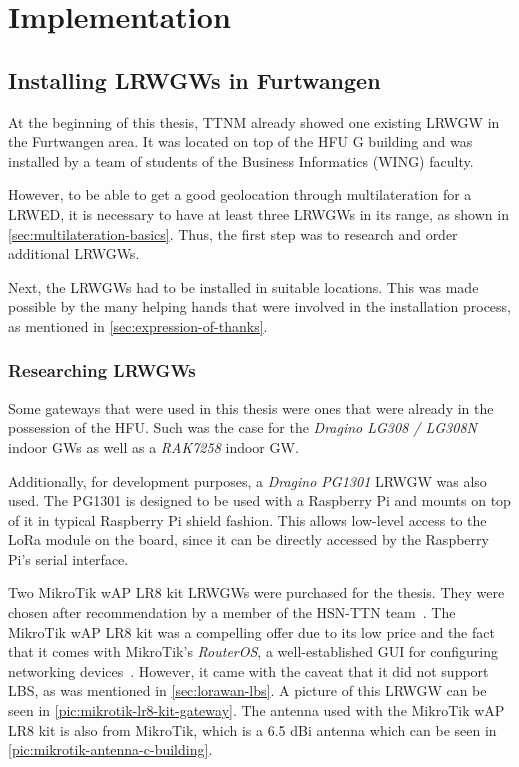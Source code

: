 \chapter{Implementation}

\section{Installing \aclp{LRWGW} in Furtwangen}

At the beginning of this thesis, \ac{TTNM} already showed one existing \acl{LRWGW} in the Furtwangen area.
It was located on top of the \ac{HFU} G building and was installed by a team of students of the Business Informatics (WING) faculty.

However, to be able to get a good geolocation through multilateration for a \acl{LRWED}, it is necessary to have at least three \aclp{LRWGW} in its range, as shown in \cref{sec:multilateration-basics}.
Thus, the first step was to research and order additional \aclp{LRWGW}.

Next, the \aclp{LRWGW} had to be installed in suitable locations.
This was made possible by the many helping hands that were involved in the installation process, as mentioned in \cref{sec:expression-of-thanks}.

\subsection{Researching \aclp{LRWGW}}

Some gateways that were used in this thesis were ones that were already in the possession of the \ac{HFU}.
Such was the case for the \emph{Dragino LG308 / LG308N} indoor \aclp{GW} as well as a \emph{RAK7258} indoor \acl{GW}.

Additionally, for development purposes, a \emph{Dragino PG1301} \acl{LRWGW} was also used.
The PG1301 is designed to be used with a Raspberry Pi and mounts on top of it in typical Raspberry Pi shield fashion.
This allows low-level access to the \ac{LoRa} module on the board, since it can be directly accessed by the Raspberry Pi's serial interface.

Two MikroTik wAP LR8 kit \aclp{LRWGW} were purchased for the thesis.
They were chosen after recommendation by a member of the \ac{HSN-TTN} team~\cite{hochschwarzwald_smart_net_-_thethingsnetwork_eingesetzte_nodate}.
The MikroTik wAP LR8 kit was a compelling offer due to its low price and the fact that it comes with MikroTik's \emph{RouterOS}, a well-established GUI for configuring networking devices~\cite{mikrotik_mikrotik_nodate}.
However, it came with the caveat that it did not support \ac{LBS}, as was mentioned in \cref{sec:lorawan-lbs}.
A picture of this \acl{LRWGW} can be seen in \cref{pic:mikrotik-lr8-kit-gateway}.
The antenna used with the MikroTik wAP LR8 kit is also from MikroTik, which is a 6.5 dBi antenna which can be seen in \cref{pic:mikrotik-antenna-c-building}.

